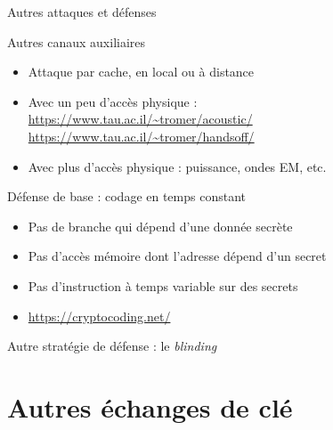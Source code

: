 \documentclass{mpg-ep-slides}
\begin{document}
\begin{frame}{Autres attaques et défenses}
  \begin{block}{Autres canaux auxiliaires}
    \begin{itemize}
      \item Attaque par cache, en local ou à distance
      \item Avec un peu d'accès physique : \\
        \url{https://www.tau.ac.il/~tromer/acoustic/} \\
        \url{https://www.tau.ac.il/~tromer/handsoff/}
      \item Avec plus d'accès physique : puissance, ondes EM, etc.
    \end{itemize}
  \end{block}

  \begin{block}{Défense de base : codage en temps constant}
    \begin{itemize}
      \item Pas de branche qui dépend d'une donnée secrète
      \item Pas d'accès mémoire dont l'adresse dépend d'un secret
      \item Pas d'instruction à temps variable sur des secrets
      \item \url{https://cryptocoding.net/}
    \end{itemize}
  \end{block}

  Autre stratégie de défense : le \emph{blinding}
\end{frame}

\section[Échanges]{Autres échanges de clé}
\tocsect
\end{document}
